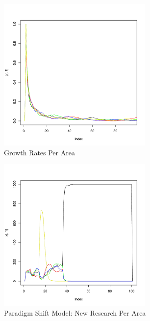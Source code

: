 \documentclass[letterpaper]{article} %
\begin{document}
\begin{figure}[H]
\begin{center}
\includegraphics[width=3in]{growthres.pdf}
\end{center}
\caption{Growth Rates Per Area}
\end{figure}
\begin{figure}[H]
\begin{center}
\includegraphics[width=3in]{newres_paradigm.pdf}
\end{center}
\caption{Paradigm Shift Model: New Research Per Area}
\end{figure}
\end{document}
